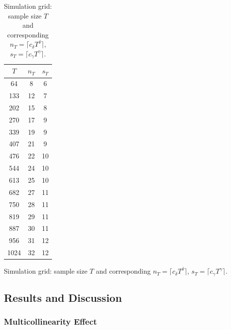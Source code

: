 \documentclass[10pt,a4paper,oneside]{article}
\providecommand{\DIFaddtex}[1]{{\protect\color{blue} \sf #1}} %
\providecommand{\DIFdeltex}[1]{{\protect\color{red} \scriptsize #1}} %
\providecommand{\DIFaddFL}[1]{\DIFadd{#1}} %
\providecommand{\DIFdelFL}[1]{\DIFdel{#1}} %
\providecommand{\DIFaddbeginFL}{} %
\providecommand{\DIFaddendFL}{} %
\providecommand{\DIFdelbeginFL}{} %
\providecommand{\DIFdelendFL}{} %
\providecommand{\DIFadd}[1]{\texorpdfstring{\DIFaddtex{#1}}{#1}} %
\providecommand{\DIFdel}[1]{\texorpdfstring{\DIFdeltex{#1}}{}} %
\newcommand{\DIFscaledelfig}{0.5}
\newlength{\DIFdelgraphicswidth} %
\newlength{\DIFdelgraphicsheight} %
\newcommand{\DIFaddincludegraphics}[2][]{{\color{blue}\fbox{\DIFOincludegraphics[#1]{#2}}}} %
\newcommand{\DIFdelincludegraphics}[2][]{%
\sbox{\DIFdelgraphicsbox}{\DIFOincludegraphics[#1]{#2}}%
\settoboxwidth{\DIFdelgraphicswidth}{\DIFdelgraphicsbox} %
\settoboxtotalheight{\DIFdelgraphicsheight}{\DIFdelgraphicsbox} %
\scalebox{\DIFscaledelfig}{%
\parbox[b]{\DIFdelgraphicswidth}{\usebox{\DIFdelgraphicsbox}\\[-\baselineskip] \rule{\DIFdelgraphicswidth}{0em}}\llap{\resizebox{\DIFdelgraphicswidth}{\DIFdelgraphicsheight}{%
\setlength{\unitlength}{\DIFdelgraphicswidth}%
\begin{picture}(1,1)%
\thicklines\linethickness{2pt} %
{\color[rgb]{1,0,0}\put(0,0){\framebox(1,1){}}}%
{\color[rgb]{1,0,0}\put(0,0){\line( 1,1){1}}}%
{\color[rgb]{1,0,0}\put(0,1){\line(1,-1){1}}}%
\end{picture}%
}\hspace*{3pt}}} %
} %
\DeclareRobustCommand{\DIFaddbeginFL}{\DIFOaddbeginFL \let\includegraphics\DIFaddincludegraphics} %
\DeclareRobustCommand{\DIFaddendFL}{\DIFOaddendFL \let\includegraphics\DIFOincludegraphics} %
\DeclareRobustCommand{\DIFdelbeginFL}{\DIFOdelbeginFL \let\includegraphics\DIFdelincludegraphics} %
\DeclareRobustCommand{\DIFdelendFL}{\DIFOaddendFL \let\includegraphics\DIFOincludegraphics} %
\begin{document}
\begin{table}[ht]
  \DIFaddbeginFL \caption{\DIFaddFL{Simulation grid: sample size $T$ and corresponding $n_{T}=\lceil c_{\delta} T^{\delta}\rceil$, $s_{T}=\lceil c_{\gamma}T^{\gamma}\rceil$.}}
  \label{tab:simulation_grid}

\DIFaddendFL \centering
\begin{tabular}{ccc}
\toprule
$T$   & $n_{T}$ & $s_{T}$ \\
\midrule
64    &  8  &  6  \\
133   & 12  &  7  \\
202   & 15  &  8  \\
270   & 17  &  9  \\
339   & 19  &  9  \\
407   & 21  &  9  \\
476   & 22  & 10  \\
544   & 24  & 10  \\
613   & 25  & 10  \\
682   & 27  & 11  \\
750   & 28  & 11  \\
819   & 29  & 11  \\
887   & 30  & 11  \\
956   & 31  & 12  \\
1024  & 32  & 12  \\
\bottomrule
\end{tabular}
\DIFdelbeginFL %
{%
\DIFdelFL{Simulation grid: sample size $T$ and corresponding $n_{T}=\lceil c_{\delta} T^{\delta}\rceil$, $s_{T}=\lceil c_{\gamma}T^{\gamma}\rceil$.}}
\DIFdelendFL \DIFaddbeginFL 

\DIFaddendFL \end{table}




\subsection{Results and Discussion}
\label{subsec:results_and_discussion}

\subsubsection{Multicollinearity Effect}
\end{document}
